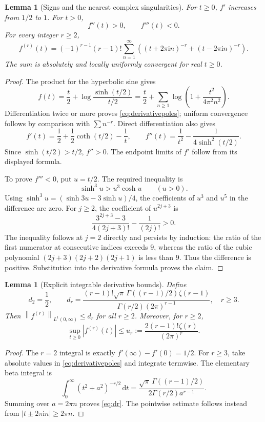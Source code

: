\documentclass[11pt,a4paper]{article}
\numberwithin{equation}{section}
\newtheorem{lemma}[theorem]{Lemma}
\theoremstyle{definition}
\newcommand{\ii}{\mathrm i}
\newcommand{\dd}{\,\mathrm d}
\newcommand{\norm}[1]{\left\lVert#1\right\rVert}
\begin{document}
\begin{lemma}[Signs and the nearest complex singularities]
\label{lem:kernel}
For $t\ge0$, $f'$ increases from $1/2$ to $1$. For $t>0$,
\[
f''(t)>0,\qquad f'''(t)<0.
\]
For every integer $r\ge2$,
\begin{equation}
f^{(r)}(t)=(-1)^{r-1}(r-1)!
\sum_{n=1}^{\infty}\left((t+2\pi\ii n)^{-r}
                         +(t-2\pi\ii n)^{-r}\right).
\label{eq:derivativepoles}
\end{equation}
The sum is absolutely and locally uniformly convergent for real $t\ge0$.
\end{lemma}
\begin{proof}
The product for the hyperbolic sine gives
\[
f(t)=\frac t2+\log\frac{\sinh(t/2)}{t/2}
=\frac t2+\sum_{n\ge1}\log\left(1+\frac{t^2}{4\pi^2n^2}\right).
\]
Differentiation twice or more proves \eqref{eq:derivativepoles}; uniform convergence follows by comparison with $\sum n^{-r}$. Direct differentiation also gives
\[
f'(t)=\frac12+\frac12\coth(t/2)-\frac1t,\qquad
f''(t)=\frac1{t^2}-\frac1{4\sinh^2(t/2)}.
\]
Since $\sinh(t/2)>t/2$, $f''>0$. The endpoint limits of $f'$ follow from its displayed formula.

To prove $f'''<0$, put $u=t/2$. The required inequality is
\[
\sinh^3u>u^3\cosh u\qquad(u>0).
\]
Using $\sinh^3u=(\sinh3u-3\sinh u)/4$, the coefficients of $u^3$ and $u^5$ in the difference are zero. For $j\ge2$, the coefficient of $u^{2j+3}$ is
\[
\frac{3^{2j+3}-3}{4(2j+3)!}-\frac1{(2j)!}>0.
\]
The inequality follows at $j=2$ directly and persists by induction: the ratio of the first numerator at consecutive indices exceeds $9$, whereas the ratio of the cubic polynomial $(2j+3)(2j+2)(2j+1)$ is less than $9$. Thus the difference is positive. Substitution into the derivative formula proves the claim.
\end{proof}

\begin{lemma}[Explicit integrable derivative bounds]
\label{lem:dbounds}
Define
\begin{equation}
d_2=\frac12,\qquad
d_r=\frac{(r-1)!\sqrt\pi\,\Gamma((r-1)/2)\zeta(r-1)}
 {\Gamma(r/2)(2\pi)^{r-1}},\quad r\ge3.
\label{eq:dr}
\end{equation}
Then $\norm{f^{(r)}}_{L^1(0,\infty)}\le d_r$ for all $r\ge2$. Moreover, for $r\ge2$,
\begin{equation}
\sup_{t\ge0}|f^{(r)}(t)|
 \le u_r:=\frac{2(r-1)!\zeta(r)}{(2\pi)^r}.
\label{eq:ur}
\end{equation}
\end{lemma}
\begin{proof}
The $r=2$ integral is exactly $f'(\infty)-f'(0)=1/2$. For $r\ge3$, take absolute values in \eqref{eq:derivativepoles} and integrate termwise. The elementary beta integral is
\[
\int_0^\infty(t^2+a^2)^{-r/2}\dd t
=\frac{\sqrt\pi\,\Gamma((r-1)/2)}{2\Gamma(r/2)a^{r-1}}.
\]
Summing over $a=2\pi n$ proves \eqref{eq:dr}. The pointwise estimate follows instead from $|t\pm2\pi\ii n|\ge2\pi n$.
\end{proof}
\end{document}
